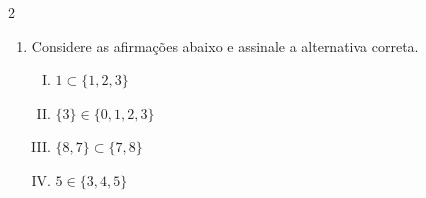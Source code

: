 \documentclass[a4paper,14pt]{article}
\begin{document}
\begin{multicols}{2}
\begin{enumerate}
\begin{enumerate}[a)]
				\item $A = \{1, \{1\}, 2\}$ e $B = \{1, \{1\}, 2, \{2\}\}$. \\\\\\\\\\\\\\\\\\\\\\
				\item $A = \{5, 6\}$ e $B = \{1, 3, 5, \{6\}\}$. \\\\\\\\\\\\\\\\\\\\\\\\\\\\
				\item $A = \{3, \{3\}, 5, \{7\}\}$ e $B = \{3, \{3\}, 5, \{5\}, 7, \{7\}\}$. \\\\\\\\\\\\\\\\\\\\\\\\\\\\
				\item $A = \{5, 6, 7, 8\}$ e $B = \{5, 6\}$.
			\end{enumerate}
			\item Considere as afirmações abaixo e assinale a alternativa correta.
			\begin{enumerate}[I.]
				\item $1 \subset \{1, 2, 3\}$
				\item $\{3\} \in \{0, 1, 2, 3\}$
				\item $\{8, 7\} \subset \{7, 8\}$
				\item $5 \in \{3, 4, 5\}$
			\end{enumerate}

\end{enumerate}
\end{multicols}
\end{document}
